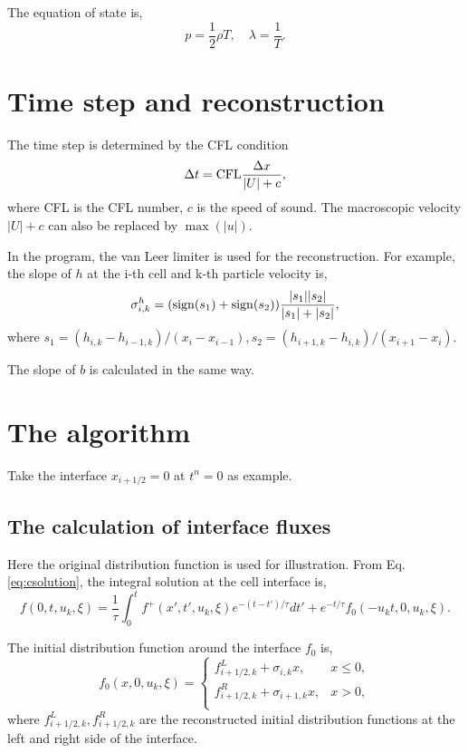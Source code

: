 \documentclass[a4paper]{book}
\begin{document}
The equation of state is,
\begin{equation} 
    \label{eq:eos}
    p=\frac{1}{2}\rho T,\quad \lambda=\frac{1}{T}.
\end{equation}

\section{Time step and reconstruction}
The time step is determined by the CFL condition
\begin{equation} 
    \Delta t={\rm CFL}\frac{\Delta x}{|U|+c},
\end{equation}
where CFL is the CFL number, $c$ is the speed of sound. The macroscopic velocity $|U|+c$ can also be replaced by $\max(|u|)$.

In the program, the van Leer limiter is used for the reconstruction. For example, the slope of $h$ at the i-th cell and k-th particle velocity is,
\begin{equation} 
    \sigma_{i,k}^h = ({\rm sign}(s_1)+{\rm sign}(s_2))\frac{|s_1||s_2|}{|s_1|+|s_2|},
\end{equation}
where $s_1=(h_{i,k}-h_{i-1,k})/(x_i-x_{i-1}), s_2=(h_{i+1,k}-h_{i,k})/(x_{i+1}-x_{i})$.

The slope of $b$ is calculated in the same way.

\section{The algorithm}
\label{sec:inner_flux}
Take the interface $x_{i+1/2}=0$ at $t^n=0$ as example.

\subsection{The calculation of interface fluxes}
Here the original distribution function is used for illustration. From Eq. \ref{eq:csolution}, the integral solution at the cell interface is,
\begin{equation}
    \label{eq:csolution_interface}
    f(0,t,u_k,\xi)=\frac{1}{\tau}\int_{0}^t f^+(x',t',u_k,\xi)e^{-(t-t')/\tau}dt'+e^{-t/\tau}f_0(-u_kt,0,u_k,\xi).
\end{equation}

The initial distribution function around the interface $f_0$ is,
\begin{equation}
    \label{eq:f0}
    f_0(x,0,u_k,\xi) = 
    \begin{cases}
        f_{i+1/2,k}^L+\sigma_{i,k}x,& x\leqslant 0,\\ 
        f_{i+1/2,k}^R+\sigma_{i+1,k}x,& x> 0,\\ 
    \end{cases}
\end{equation}
where $f_{i+1/2,k}^L, f_{i+1/2,k}^R$ are the reconstructed initial distribution functions at the left and right side of the interface.
\end{document}
